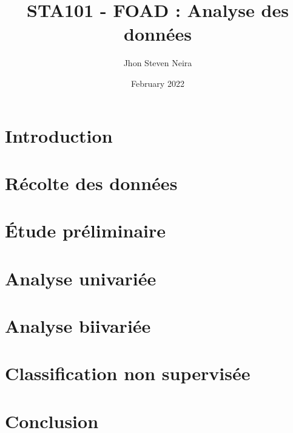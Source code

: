 \documentclass[12pt, a4paper]{article}
\title{STA101 - FOAD : Analyse des données}
\author{Jhon Steven Neira}
\date{February 2022}
\begin{document}
  
\maketitle
  
\tableofcontents

\section{Introduction}
   



\section{Récolte des  données }



\section{Étude préliminaire}



\section{Analyse univariée}



\section{Analyse biivariée}



\section{Classification non supervisée }


\section{Conclusion }


         
\end{document}
